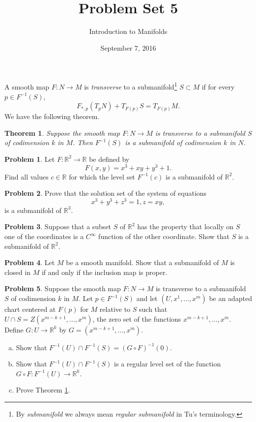 \documentclass{amsart}
\newcommand{\+}[1]{\ensuremath{\mathbf{#1}}}
\newcommand{\R}{{\mathbb R}}
\newtheorem{thm}{Theorem}
\theoremstyle{definition}
\newtheorem{prob}{Problem}
\begin{document}
\title{Problem Set 5}
\date{September 7, 2016}
\author{Introduction to Manifolds}

\maketitle

A smooth map $F:N \to M$ is \emph{transverse} to a 
submanifold\footnote{By \emph{submanifold} we always mean \emph{regular submanifold} in Tu's terminology.}
$S \subset M$ if for every $p \in F^{-1}(S)$,
\[
F_{*,p}(T_pN) + T_{F(p)}S = T_{F(p)}M.
\]
We have the following theorem.


\begin{framed}
\begin{thm}\label{T:transversality}
Suppose the smooth map $F: N \to M$ is transverse to a
submanifold $S$ of codimension $k$ in $M$.  Then
$F^{-1}(S)$ is a submanifold of codimension $k$ in $N$.
\end{thm}
\end{framed}

\begin{prob}
Let $F:\R^2 \to \R$ be defined by
\[
 F(x,y) = x^3 + xy + y^3 +1.
\]
Find all values $c \in \R$ for which
the level set $F^{-1}(c)$ is a  submanifold of $\R^2$.
\end{prob}

\begin{prob}
 Prove that the solution set of the system of equations
 \[
  x^3 + y^3 + z^3 = 1, z = xy,
 \]
is a submanifold of $\R^3$.
\end{prob}


\begin{prob}
Suppose that a subset $S$ of $\R^2$ has the property that
locally on $S$ one of the coordinates is a $C^\infty$ function
of the other coordinate.  Show that $S$ is a submanifold of $\R^2$.
\end{prob} 




\begin{prob}
Let $M$ be a smooth manifold.
Show that a submanifold of $M$ is closed in $M$ if and only if
the inclusion map is proper.
\end{prob}




\begin{prob}
Suppose the smooth map $F: N \to M$ is transverse to a
submanifold $S$ of codimension $k$ in $M$.
Let $p \in F^{-1}(S)$ and let $(U,x^1,\ldots,x^m)$ be an
adapted chart centered at $F(p)$ for $M$ relative to $S$
such that $U \cap S = Z(x^{m-k+1},\ldots,x^m)$,
the zero set of the functions $x^{m-k+1},\ldots,x^m$.
Define $G:U \to \R^k$ by $G = (x^{m-k+1},\ldots,x^m)$.
\begin{enumerate}[(a)]
 \item Show that $F^{-1}(U) \cap F^{-1}(S) = (G \circ F)^{-1}(0)$.
 \item Show that $F^{-1}(U) \cap F^{-1}(S)$ is a regular level set
 of the function $G \circ F: F^{-1}(U) \to \R^k$.
 \item Prove Theorem \ref{T:transversality}.
\end{enumerate}

\end{prob}
\end{document}
